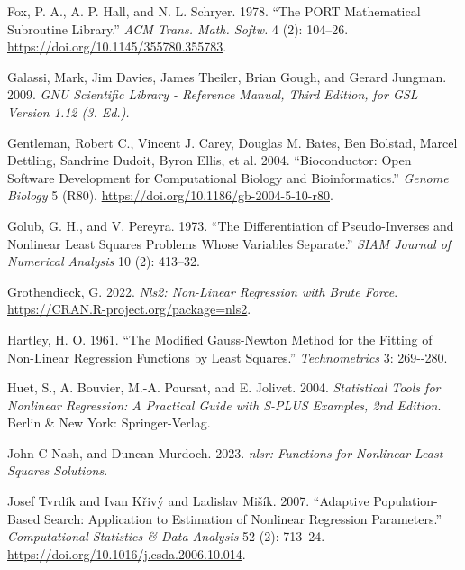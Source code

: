 \documentclass[
]{article}
\newlength{\cslhangindent}
\newlength{\cslentryspacingunit} %
\newenvironment{CSLReferences}[2] %
 {%
  \setlength{\parindent}{0pt}
  \ifodd #1
  \let\oldpar\par
  \def\par{\hangindent=\cslhangindent\oldpar}
  \fi
  \setlength{\parskip}{#2\cslentryspacingunit}
 }%
 {}
\begin{document}
\begin{CSLReferences}{1}{0}
\leavevmode{}%
Fox, P. A., A. P. Hall, and N. L. Schryer. 1978. {``The PORT
Mathematical Subroutine Library.''} \emph{ACM Trans. Math. Softw.} 4
(2): 104--26. \url{https://doi.org/10.1145/355780.355783}.

\leavevmode{}%
Galassi, Mark, Jim Davies, James Theiler, Brian Gough, and Gerard
Jungman. 2009. \emph{GNU Scientific Library - Reference Manual, Third
Edition, for GSL Version 1.12 (3. Ed.).}

\leavevmode{}%
Gentleman, Robert C., Vincent J. Carey, Douglas M. Bates, Ben Bolstad,
Marcel Dettling, Sandrine Dudoit, Byron Ellis, et al. 2004.
{``Bioconductor: Open Software Development for Computational Biology and
Bioinformatics.''} \emph{{Genome Biology}} 5 (R80).
\url{https://doi.org/10.1186/gb-2004-5-10-r80}.

\leavevmode{}%
Golub, G. H., and V. Pereyra. 1973. {``The Differentiation of
Pseudo-Inverses and Nonlinear Least Squares Problems Whose Variables
Separate.''} \emph{SIAM Journal of Numerical Analysis} 10 (2): 413--32.

\leavevmode{}%
Grothendieck, G. 2022. \emph{Nls2: Non-Linear Regression with Brute
Force}. \url{https://CRAN.R-project.org/package=nls2}.

\leavevmode{}%
Hartley, H. O. 1961. {``The Modified Gauss-Newton Method for the Fitting
of Non-Linear Regression Functions by Least Squares.''}
\emph{Technometrics} 3: 269-\/-280.

\leavevmode{}%
Huet, S., A. Bouvier, M.-A. Poursat, and E. Jolivet. 2004.
\emph{Statistical Tools for Nonlinear Regression: A Practical Guide with
{S-PLUS} Examples, 2nd Edition}. Berlin \& New York: Springer-Verlag.

\leavevmode{}%
John C Nash, and Duncan Murdoch. 2023. \emph{{nlsr: Functions for
Nonlinear Least Squares Solutions}}.

\leavevmode{}%
Josef Tvrdík and Ivan Křivý and Ladislav Mišík. 2007. {``Adaptive
Population-Based Search: Application to Estimation of Nonlinear
Regression Parameters.''} \emph{{Computational Statistics \& Data
Analysis}} 52 (2): 713--24.
\url{https://doi.org/10.1016/j.csda.2006.10.014}.


\end{CSLReferences}
\end{document}
